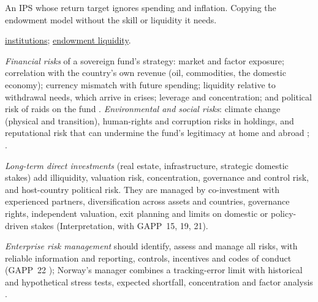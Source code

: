 \begin{qfmethod}
 An IPS whose return target ignores spending and inflation. Copying the endowment model without the skill or liquidity it needs.

 \hyperref[def:institutional-investor-characteristics]{institutions}; \hyperref[meth:endowment-liquidity-allocation]{endowment liquidity}.

\end{qfmethod}

\begin{qfmethod}\label{meth:swf-risk-case}
 \emph{Financial risks} of a sovereign fund's strategy: market and factor exposure; correlation with the country's own revenue (oil, commodities, the domestic economy); currency mismatch with future spending; liquidity relative to withdrawal needs, which arrive in crises; leverage and concentration; and political risk of raids on the fund \citep[chap.~1, pp.~7--12]{s7-ang}. \emph{Environmental and social risks}: climate change (physical and transition), human-rights and corruption risks in holdings, and reputational risk that can undermine the fund's legitimacy at home and abroad \citep[chap.~3, pp.~71--73]{s7-ang}; \citep[climate action plan]{nbim-gpfg-2026}.

\emph{Long-term direct investments} (real estate, infrastructure, strategic domestic stakes) add illiquidity, valuation risk, concentration, governance and control risk, and host-country political risk. They are managed by co-investment with experienced partners, diversification across assets and countries, governance rights, independent valuation, exit planning and limits on domestic or policy-driven stakes (Interpretation, with GAPP~15, 19, 21).

\emph{Enterprise risk management} should identify, assess and manage all risks, with reliable information and reporting, controls, incentives and codes of conduct (GAPP~22 \citep[GAPP~22]{santiago-principles-2008}); Norway's manager combines a tracking-error limit with historical and hypothetical stress tests, expected shortfall, concentration and factor analysis \citep[risk management]{nbim-gpfg-2026}.


\end{qfmethod}
